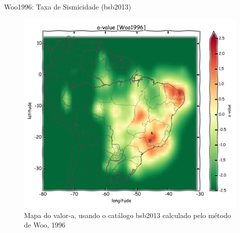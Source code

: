 \documentclass[ucs,8pt]{beamer}
\begin{document}
\begin{frame}{Woo1996: Taxa de Sismicidade (\gls{bsb2013})}

\begin{figure}[H]
  \centering
  \includegraphics[height=.95\textheight]{a_woo} 
  \caption{Mapa do valor-a, usando o catálogo \gls{bsb2013} calculado pelo método de Woo, 1996 }
  \label{fig:a_woo} 
\end{figure}

\end{frame}
\end{document}
